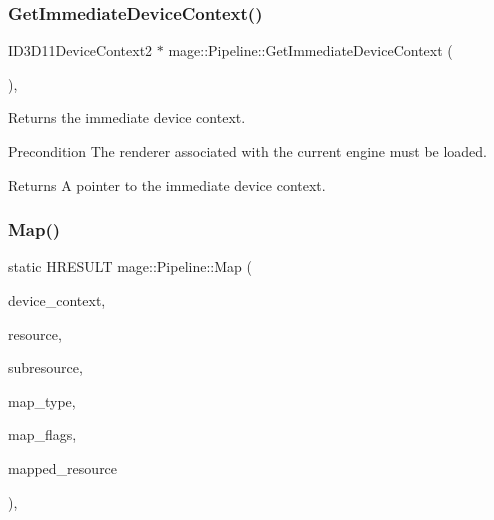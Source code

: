 \subsubsection{\texorpdfstring{Get\+Immediate\+Device\+Context()}{GetImmediateDeviceContext()}}
{\footnotesize\ttfamily I\+D3\+D11\+Device\+Context2 $\ast$ mage\+::\+Pipeline\+::\+Get\+Immediate\+Device\+Context (\begin{DoxyParamCaption}{ }\end{DoxyParamCaption})\hspace{0.3cm}{\ttfamily [static]}, {\ttfamily [noexcept]}}

Returns the immediate device context.

\begin{DoxyPrecond}{Precondition}
The renderer associated with the current engine must be loaded. 
\end{DoxyPrecond}
\begin{DoxyReturn}{Returns}
A pointer to the immediate device context. 
\end{DoxyReturn}
\hypertarget{structmage_1_1_pipeline_a5b145ad92c746487b4eeec7c2d190729}{}\label{structmage_1_1_pipeline_a5b145ad92c746487b4eeec7c2d190729} 
\subsubsection{\texorpdfstring{Map()}{Map()}}
{\footnotesize\ttfamily static H\+R\+E\+S\+U\+LT mage\+::\+Pipeline\+::\+Map (\begin{DoxyParamCaption}\item[{I\+D3\+D11\+Device\+Context2 $\ast$}]{device\+\_\+context,  }\item[{I\+D3\+D11\+Resource $\ast$}]{resource,  }\item[{\hyperlink{namespacemage_af2b398bf98eb10351f49cad73fe2cc73}{u32}}]{subresource,  }\item[{D3\+D11\+\_\+\+M\+AP}]{map\+\_\+type,  }\item[{\hyperlink{namespacemage_af2b398bf98eb10351f49cad73fe2cc73}{u32}}]{map\+\_\+flags,  }\item[{D3\+D11\+\_\+\+M\+A\+P\+P\+E\+D\+\_\+\+S\+U\+B\+R\+E\+S\+O\+U\+R\+CE $\ast$}]{mapped\+\_\+resource }\end{DoxyParamCaption})\hspace{0.3cm}{\ttfamily [static]}, {\ttfamily [noexcept]}}

\hypertarget{structmage_1_1_pipeline_a8d88f7c1e6e436c55fc7947334efaa9e}{}\label{structmage_1_1_pipeline_a8d88f7c1e6e436c55fc7947334efaa9e} 
